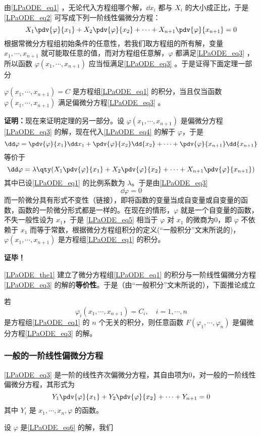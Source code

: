 由\autoref{LPaODE_eq1} ，无论代入方程组哪个解，$\dd x_i$ 都与 $X_i$ 的大小成正比，于是\autoref{LPaODE_eq2} 可写成下列一阶线性偏微分方程：
\begin{equation}\label{LPaODE_eq3}
X_1\pdv{\varphi}{x_1}+X_2\pdv{\varphi}{x_2}+\cdots+X_{n+1}\pdv{\varphi}{x_{n+1}}=0
\end{equation}
根据常微分方程组初始条件的任意性，若我们取方程组的所有解，变量 $x_1,\cdots,x_{n+1}$ 就可能取任意的值，而对方程组任意解，$\varphi$ 都满足\autoref{LPaODE_eq3} ，所以函数 $\varphi(x_1,\cdots,x_{n+1})$ 应当恒满足\autoref{LPaODE_eq3} 。于是证得下面定理一部分
\begin{theorem}{}\label{LPaODE_the1}
 $\varphi(x_1,\cdots,x_{n+1})=C$ 是方程组\autoref{LPaODE_eq1} 的积分，当且仅当函数 $\varphi(x_1,\cdots,x_{n+1})$ 满足偏微分方程\autoref{LPaODE_eq3} 。
\end{theorem}
 \textbf{证明：}现在来证明定理的另一部分。设 $\varphi(x_1,\cdots,x_{n+1})$ 是偏微分方程\autoref{LPaODE_eq3} 的解，现在代入\autoref{LPaODE_eq4} 的解于 $\varphi$，于是
 \begin{equation}
 \dd\varphi=\pdv{\varphi}{x_1}\dd x_1+\pdv{\varphi}{x_2}\dd{x_2}+\cdots+\pdv{\varphi}{x_{n+1}}\dd{x_{n+1}}
 \end{equation}
 等价于
 \begin{equation}
 \dd\varphi=\lambda\qty(X_1\pdv{\varphi}{x_1}+X_2\pdv{\varphi}{x_2}+\cdots+X_{n+1}\pdv{\varphi}{x_{n+1}})
 \end{equation}
 其中已设\autoref{LPaODE_eq1} 的比例系数为 $\lambda$。于是由\autoref{LPaODE_eq3} 
 \begin{equation}\label{LPaODE_eq5}
 \dd\varphi=0
 \end{equation}
 而一阶微分具有形式不变性（链接），即将函数的变量当成自变量或自变量的函数，函数的一阶微分形式都是一样的。在现在的情形，$\varphi$ 就是一个自变量的函数，不失一般性设为 $x_1$，于是 \autoref{LPaODE_eq5} 相当于 $\varphi$ 对 $x_1$ 的微商为0，即 $\varphi$ 不依赖于 $x_1$ 而等于常数，根据微分方程组积分的定义(“一般积分”文末所说的)，$\varphi(x_1,\cdots,x_{n+1})$ 是方程组\autoref{LPaODE_eq1} 的积分。

 \textbf{证毕！}

 \autoref{LPaODE_the1} 建立了微分方程组\autoref{LPaODE_eq1} 的积分与一阶线性偏微分方程\autoref{LPaODE_eq3} 的解的\textbf{等价性}。于是（由“一般积分”文末所说的），下面推论成立
 \begin{corollary}{}
 若
 \begin{equation}
 \varphi_i(x_1,\cdots,x_{n+1})=C_i,\quad i=1,\cdots,n
 \end{equation}
 是方程组\autoref{LPaODE_eq1} 的 $n$ 个无关的积分，则任意函数 $F(\varphi_1,\cdots,\varphi_n)$ 是偏微分方程\autoref{LPaODE_eq3} 的解。
 \end{corollary}
\subsubsection{一般的一阶线性偏微分方程}
\autoref{LPaODE_eq3} 是一阶的线性齐次偏微分方程，其自由项为0，对一般的一阶线性偏微分方程，其形式为
\begin{equation}\label{LPaODE_eq6}
Y_1\pdv{\varphi}{x_1}+Y_2\pdv{\varphi}{x_2}+\cdots+Y_{n+1}=0
\end{equation}
其中 $Y_i$ 是 $x_1,\cdots,x_n,\varphi$ 的函数。

设 $\varphi$ 是\autoref{LPaODE_eq6} 的解，我们